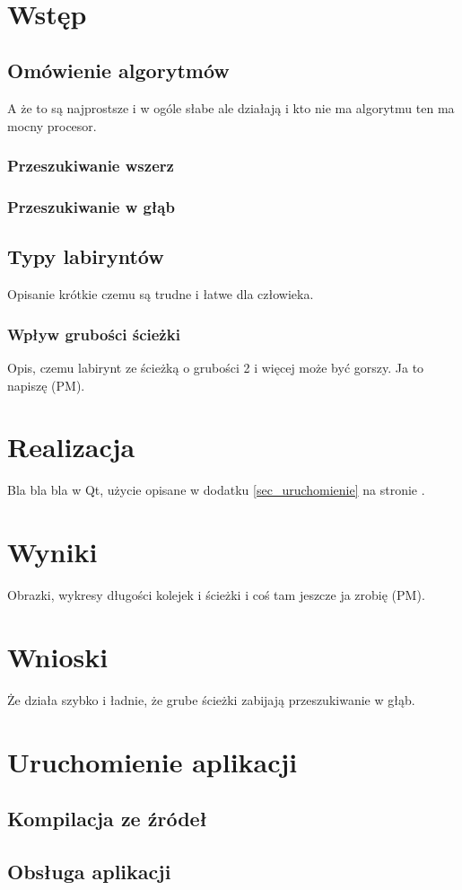 \documentclass[11pt,a4paper,oneside]{mwart}
\begin{document}



\newpage
\thispagestyle{empty}
~~~~~~~~~~~~~~
\newpage

\setcounter{tocdepth}{3}
\tableofcontents
\newpage
\section{Wstęp}
\subsection{Omówienie algorytmów}
A że to są najprostsze i w ogóle słabe ale działają i kto nie ma algorytmu ten ma mocny procesor.
\subsubsection{Przeszukiwanie wszerz}
\subsubsection{Przeszukiwanie w głąb}

\subsection{Typy labiryntów}
Opisanie krótkie czemu są trudne i łatwe dla człowieka.

\subsubsection{Wpływ grubości ścieżki}
Opis, czemu labirynt ze ścieżką o grubości 2 i więcej może być gorszy. Ja to napiszę (PM).

\section{Realizacja}
Bla bla bla w Qt, użycie opisane w dodatku \ref{sec_uruchomienie} na stronie \pageref{sec_uruchomienie}.

\section{Wyniki}
Obrazki, wykresy długości kolejek i ścieżki i coś tam jeszcze ja zrobię (PM).

\section{Wnioski}
Że działa szybko i ładnie, że grube ścieżki zabijają przeszukiwanie w głąb.


\appendix

\section{Uruchomienie aplikacji\label{sec_uruchomienie}}

\subsection{Kompilacja ze źródeł}

\subsection{Obsługa aplikacji}
\end{document}
